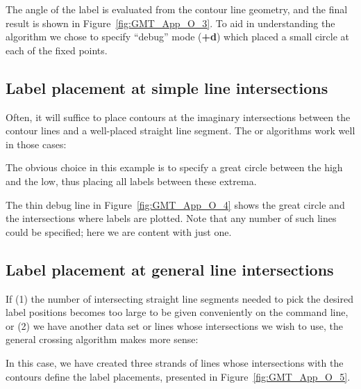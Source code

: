 
\noindent
The angle of the label is evaluated from the contour line geometry, and the final result
is shown in Figure~\ref{fig:GMT_App_O_3}.
To aid in understanding the algorithm we chose to specify ``debug'' mode (\textbf{+d}) which placed a
small circle at each of the fixed points.

\subsection{Label placement at simple line intersections}

Often, it will suffice to place contours at the imaginary intersections between the
contour lines and a well-placed straight line segment.  The  or 
algorithms work well in those cases:


\noindent
The obvious choice in this example is to specify a great circle between the high and
the low, thus placing all labels between these extrema.

\noindent
The thin debug line in Figure~\ref{fig:GMT_App_O_4} shows the great circle and the
intersections where labels are plotted.  Note that any number of such lines could be specified;
here we are content with just one.

\subsection{Label placement at general line intersections}

If (1) the number of intersecting straight line segments needed to pick the desired label
positions becomes too large to be given conveniently on the command line, or (2) we have
another data set or lines whose intersections we wish to use, the general crossing
algorithm makes more sense:



\noindent
In this case, we have created three strands of lines whose intersections with the contours
define the label placements, presented in Figure~\ref{fig:GMT_App_O_5}.

